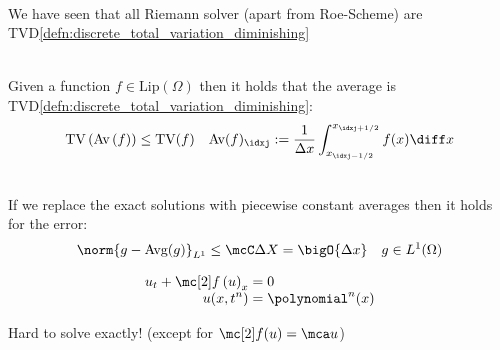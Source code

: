 \begin{corbox}\nospacing
    \begin{cor}\label{cor:evolution_is_tvd}\leavevmode\\
        We have seen that all Riemann solver (apart from Roe-Scheme) are TVD\cref{defn:discrete_total_variation_diminishing}
    \end{cor}
\end{corbox}
\begin{corbox}\nospacing
    \begin{cor}\label{cor:averaging_is_tvd}\leavevmode\\
        Given a function $f\in\text{Lip}(\Omega)$ then it holds that the average is TVD\cref{defn:discrete_total_variation_diminishing}:
        \begin{align}
          \text{TV}\left(\text{Av}\left(f\right)\right)\leq\text{TV}(f)&&
          \text{Av}(f)_{\idxj}:=\frac{1}{\Delta x}\int_{x_{\idxj-1/2}}^{x_{\idxj+1/2}}f(x)\diff x
        \end{align}
    \end{cor}
\end{corbox}
\begin{lemmabox}
    \begin{lemma}\label{piecewise_constant_averaging}\leavevmode\\
        If we replace the exact solutions with piecewise constant averages then it holds for the error:
        \begin{align}
          \norm{g-\text{Avg}(g)}_{L^{1}}\leq \mcC\Delta X=\bigO{\Delta x}&&g\in L^{1}(\Omega)
        \end{align}
    \end{lemma}
\end{lemmabox}
\begin{defnbox}\nospacing
    \begin{defn}
        \label{defn:generalized_riemann_problem}
            \begin{align}
            u_{t}+\flux \left(u\right)_{x}&=0 \\[-1\jot]
            u(x,t^{n})&=\polynomial^{n}(x)            \label{eq:generalized_riemann_problem}
            \end{align}
    \end{defn}
\end{defnbox}
\begin{sectionbox}\nospacing
   \begin{conslist}
       \item Hard to solve exactly! (except for $\flux(u)=\mca u$)
   \end{conslist}
\end{sectionbox}



